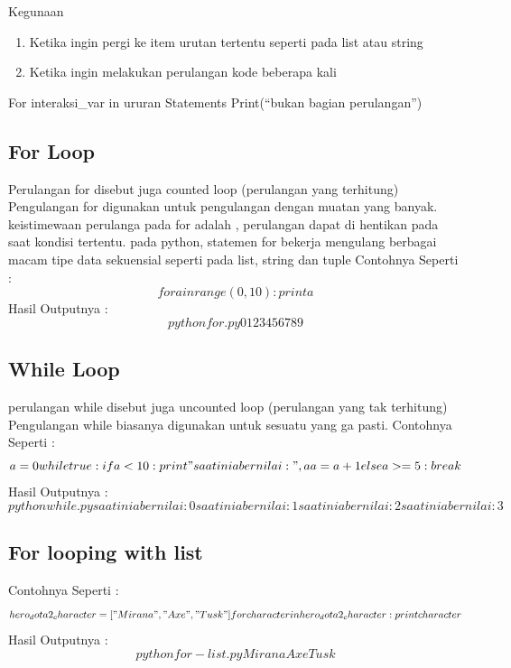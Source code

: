 Kegunaan
\begin{enumerate}
\item Ketika ingin pergi ke item urutan tertentu seperti pada list atau string
\item Ketika ingin melakukan perulangan kode beberapa kali
\end{enumerate}
For interaksi_var in ururan
Statements
Print(“bukan bagian perulangan”) 

\subsection{For Loop}
Perulangan for disebut juga counted loop (perulangan yang terhitung)
Pengulangan for digunakan untuk pengulangan dengan muatan yang banyak\cite{van2007python}.
keistimewaan perulanga pada for adalah , perulangan dapat di hentikan pada saat kondisi tertentu. pada python, statemen for bekerja mengulang berbagai macam tipe data sekuensial seperti pada list, string dan tuple
Contohnya Seperti :
\begin{equation}
for a in range(0, 10):
	print a
\end{equation}
Hasil Outputnya :
\begin{equation}
python for.py
0
1
2
3
4
5
6
7
8
9
\end{equation}




\subsection{While Loop}
perulangan while disebut juga uncounted loop (perulangan yang tak terhitung)
Pengulangan while biasanya digunakan untuk sesuatu yang ga pasti.
Contohnya Seperti :
\begin{equation}
a = 0
while true:
	if a < 10:
		print "saat ini a bernilai: ", a
		a = a + 1
	else a >= 5:
		break
\end{equation}
Hasil Outputnya :
\begin{equation}
python while.py
saat ini a bernilai: 0
saat ini a bernilai: 1
saat ini a bernilai: 2
saat ini a bernilai: 3
\end{equation}

\subsection{For looping with list}
Contohnya Seperti :
\begin{equation}
hero_dota2_character = ["Mirana", "Axe", "Tusk"]
for character in hero_dota2_character:
	print character
\end{equation}
Hasil Outputnya :
\begin{equation}
python for-list.py
Mirana
Axe
Tusk
\end{equation}

